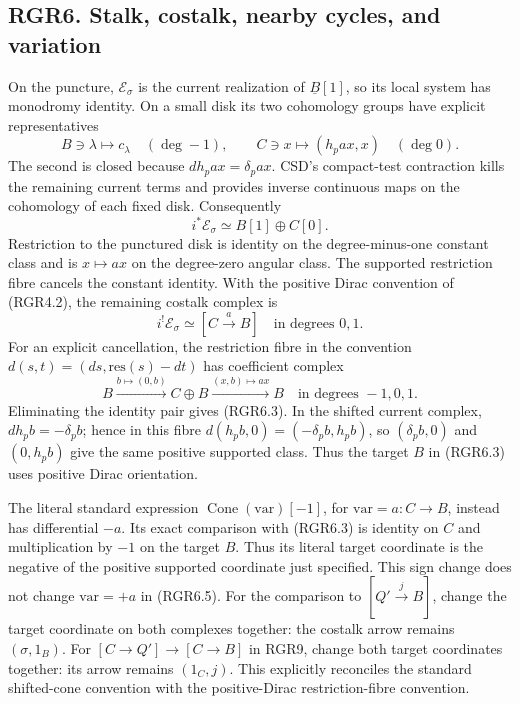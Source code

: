 \subsection{RGR6. Stalk, costalk, nearby cycles, and
variation}\label{rgr6.-stalk-costalk-nearby-cycles-and-variation}

On the puncture, \(\mathscr E_\sigma\) is the current realization of
\(\underline B[1]\), so its local system has monodromy identity. On a
small disk its two cohomology groups have explicit representatives \[
 B\ni\lambda\longmapsto c_\lambda\quad(\deg -1),\qquad
 C\ni x\longmapsto(h_p a x,x)\quad(\deg0).
 \tag{RGR6.1}
\] The second is closed because \(dh_p a x=\delta_p a x\). CSD's
compact-test contraction kills the remaining current terms and provides
inverse continuous maps on the cohomology of each fixed disk.
Consequently \[
 i^*\mathscr E_\sigma\simeq B[1]\oplus C[0].
 \tag{RGR6.2}
\] Restriction to the punctured disk is identity on the degree-minus-one
constant class and is \(x\mapsto a x\) on the degree-zero angular class.
The supported restriction fibre cancels the constant identity. With the
positive Dirac convention of (RGR4.2), the remaining costalk complex is
\[
 \boxed{i^!\mathscr E_\sigma\simeq[C\xrightarrow{\ a\ }B]
       \quad\text{in degrees }0,1.}
 \tag{RGR6.3}
\] For an explicit cancellation, the restriction fibre in the convention
\(d(s,t)=(ds,\mathrm{res}(s)-dt)\) has coefficient complex \[
 B\xrightarrow{b\mapsto(0,b)}C\oplus B
    \xrightarrow{(x,b)\mapsto a x}B
 \quad\text{in degrees }-1,0,1.
 \tag{RGR6.3a}
\] Eliminating the identity pair gives (RGR6.3). In the shifted current
complex, \(d h_p b=-\delta_pb\); hence in this fibre
\(d(h_pb,0)=(-\delta_pb,h_pb)\), so \((\delta_pb,0)\) and \((0,h_pb)\)
give the same positive supported class. Thus the target \(B\) in
(RGR6.3) uses positive Dirac orientation.

The literal standard expression
\(\operatorname{Cone}(\mathrm{var})[-1]\), for
\(\mathrm{var}=a:C\to B\), instead has differential \(-a\). Its exact
comparison with (RGR6.3) is identity on \(C\) and multiplication by
\(-1\) on the target \(B\). Thus its literal target coordinate is the
negative of the positive supported coordinate just specified. This sign
change does not change \(\mathrm{var}=+a\) in (RGR6.5). For the
comparison to \([Q'\xrightarrow jB]\), change the target coordinate on
both complexes together: the costalk arrow remains \((\sigma,1_B)\). For
\([C\to Q']\to[C\to B]\) in RGR9, change both target coordinates
together: its arrow remains \((1_C,j)\). This explicitly reconciles the
standard shifted-cone convention with the positive-Dirac
restriction-fibre convention.

